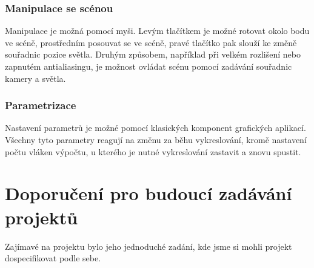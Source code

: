 \documentclass[12pt,a4paper,titlepage,final]{report}
\begin{document}
\subsection{Manipulace se scénou}
Manipulace je možná pomocí myši. Levým tlačítkem je možné rotovat okolo bodu ve scéně, prostředním posouvat se ve scéně,
pravé tlačítko pak slouží ke změně souřadnic pozice světla. Druhým způsobem, například při velkém rozlišení nebo zapnutém antialiasingu, je možnost ovládat scénu pomocí zadávání souřadnic kamery a světla.

\subsection{Parametrizace}
Nastavení parametrů je možné pomocí klasických komponent grafických aplikací. Všechny tyto parametry reagují na změnu za běhu vykreslování, kromě nastavení počtu vláken výpočtu, u kterého je nutné vykreslování zastavit a znovu spustit.

\chapter{Doporučení pro budoucí zadávání projektů}

Zajímavé na projektu bylo jeho jednoduché zadání, kde jsme si mohli projekt dospecifikovat podle sebe. 





\end{document}
